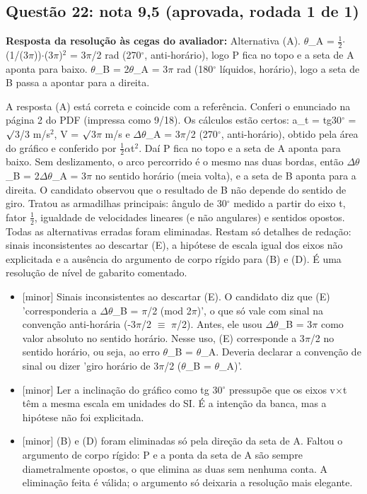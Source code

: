 \documentclass{article}%
\begin{document}
\subsection*{Questão 22: nota 9,5 (aprovada, rodada 1 de 1)}%
\textbf{Resposta da resolução às cegas do avaliador:} Alternativa (A). $\theta$\_A = $\frac12$$\cdot$(1/(3$\pi$))$\cdot$(3$\pi$)$^2$ = 3$\pi$/2 rad (270$^\circ$, anti{-}horário), logo P fica no topo e a seta de A aponta para baixo. $\theta$\_B = 2$\theta$\_A = 3$\pi$ rad (180$^\circ$ líquidos, horário), logo a seta de B passa a apontar para a direita.\par %
A resposta (A) está correta e coincide com a referência. Conferi o enunciado na página 2 do PDF (impressa como 9/18). Os cálculos estão certos: a\_t = tg30$^\circ$ = $\surd$3/3 m/s$^2$, V = $\surd$3$\pi$ m/s e $\Delta$$\theta$\_A = 3$\pi$/2 (270$^\circ$, anti{-}horário), obtido pela área do gráfico e conferido por $\frac12$$\alpha$t$^2$. Daí P fica no topo e a seta de A aponta para baixo. Sem deslizamento, o arco percorrido é o mesmo nas duas bordas, então $\Delta$$\theta$\_B = 2$\Delta$$\theta$\_A = 3$\pi$ no sentido horário (meia volta), e a seta de B aponta para a direita. O candidato observou que o resultado de B não depende do sentido de giro. Tratou as armadilhas principais: ângulo de 30$^\circ$ medido a partir do eixo t, fator $\frac12$, igualdade de velocidades lineares (e não angulares) e sentidos opostos. Todas as alternativas erradas foram eliminadas. Restam só detalhes de redação: sinais inconsistentes ao descartar (E), a hipótese de escala igual dos eixos não explicitada e a ausência do argumento de corpo rígido para (B) e (D). É uma resolução de nível de gabarito comentado.%
\begin{itemize}%
\item%
{[}minor{]} Sinais inconsistentes ao descartar (E). O candidato diz que (E) 'corresponderia a $\Delta$$\theta$\_B = $\pi$/2 (mod 2$\pi$)', o que só vale com sinal na convenção anti{-}horária (-3$\pi$/2 $\equiv$ $\pi$/2). Antes, ele usou $\Delta$$\theta$\_B = 3$\pi$ como valor absoluto no sentido horário. Nesse uso, (E) corresponde a 3$\pi$/2 no sentido horário, ou seja, ao erro $\theta$\_B = $\theta$\_A. Deveria declarar a convenção de sinal ou dizer 'giro horário de 3$\pi$/2 ($\theta$\_B = $\theta$\_A)'.%
\item%
{[}minor{]} Ler a inclinação do gráfico como tg 30$^\circ$ pressupõe que os eixos v$\times$t têm a mesma escala em unidades do SI. É a intenção da banca, mas a hipótese não foi explicitada.%
\item%
{[}minor{]} (B) e (D) foram eliminadas só pela direção da seta de A. Faltou o argumento de corpo rígido: P e a ponta da seta de A são sempre diametralmente opostos, o que elimina as duas sem nenhuma conta. A eliminação feita é válida; o argumento só deixaria a resolução mais elegante.%
\end{itemize}%
\end{document}
